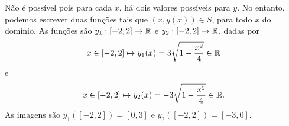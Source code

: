 Não é possível pois para cada $x$, há dois valores possíveis para $y$.
No entanto, podemos escrever duas funções tais que $(x,y(x))\in S$, para todo
$x$ do domínio.
As funções são $y_1:[-2,2]\rightarrow\mathbb{R}$ e $y_2:[-2,2]\rightarrow\mathbb{R}$, dadas por
\[
	x\in[-2,2]\mapsto y_1(x)=3\sqrt{1-\frac{x^2}{4}}\in\mathbb{R}
\]
e
\[
	x\in[-2,2]\mapsto y_2(x)=-3\sqrt{1-\frac{x^2}{4}}\in\mathbb{R}.
\]
As imagens são $y_1([-2,2])=[0,3]$ e $y_2([-2,2])=[-3,0]$.
